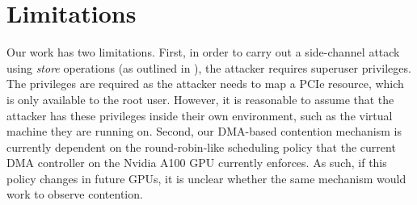 \section{Limitations}
\label{sec:interconnect-sc-limitations}

Our work has two limitations.
First, in order to carry out a side-channel attack using \textit{store} operations (as outlined in ), the attacker requires superuser privileges.
The privileges are required as the attacker needs to map a PCIe resource, which is only available to the root user.
However, it is reasonable to assume that the attacker has these privileges inside their own environment, such as the virtual machine they are running on.
Second, our DMA-based contention mechanism is currently dependent on the round-robin-like scheduling policy that the current DMA controller on the Nvidia A100 GPU currently enforces.
As such, if this policy changes in future GPUs, it is unclear whether the same mechanism would work to observe contention.
